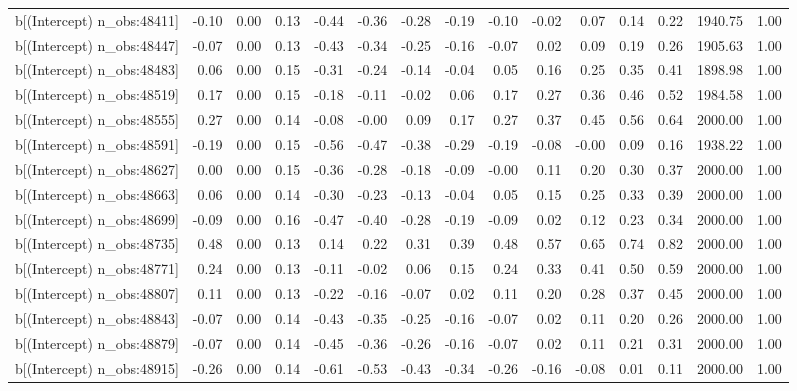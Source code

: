 \begin{table}[ht]
\begin{tabular}{rrrrrrrrrrrrrrr}
  b[(Intercept) n\_obs:48411] & -0.10 & 0.00 & 0.13 & -0.44 & -0.36 & -0.28 & -0.19 & -0.10 & -0.02 & 0.07 & 0.14 & 0.22 & 1940.75 & 1.00 \\ 
  b[(Intercept) n\_obs:48447] & -0.07 & 0.00 & 0.13 & -0.43 & -0.34 & -0.25 & -0.16 & -0.07 & 0.02 & 0.09 & 0.19 & 0.26 & 1905.63 & 1.00 \\ 
  b[(Intercept) n\_obs:48483] & 0.06 & 0.00 & 0.15 & -0.31 & -0.24 & -0.14 & -0.04 & 0.05 & 0.16 & 0.25 & 0.35 & 0.41 & 1898.98 & 1.00 \\ 
  b[(Intercept) n\_obs:48519] & 0.17 & 0.00 & 0.15 & -0.18 & -0.11 & -0.02 & 0.06 & 0.17 & 0.27 & 0.36 & 0.46 & 0.52 & 1984.58 & 1.00 \\ 
  b[(Intercept) n\_obs:48555] & 0.27 & 0.00 & 0.14 & -0.08 & -0.00 & 0.09 & 0.17 & 0.27 & 0.37 & 0.45 & 0.56 & 0.64 & 2000.00 & 1.00 \\ 
  b[(Intercept) n\_obs:48591] & -0.19 & 0.00 & 0.15 & -0.56 & -0.47 & -0.38 & -0.29 & -0.19 & -0.08 & -0.00 & 0.09 & 0.16 & 1938.22 & 1.00 \\ 
  b[(Intercept) n\_obs:48627] & 0.00 & 0.00 & 0.15 & -0.36 & -0.28 & -0.18 & -0.09 & -0.00 & 0.11 & 0.20 & 0.30 & 0.37 & 2000.00 & 1.00 \\ 
  b[(Intercept) n\_obs:48663] & 0.06 & 0.00 & 0.14 & -0.30 & -0.23 & -0.13 & -0.04 & 0.05 & 0.15 & 0.25 & 0.33 & 0.39 & 2000.00 & 1.00 \\ 
  b[(Intercept) n\_obs:48699] & -0.09 & 0.00 & 0.16 & -0.47 & -0.40 & -0.28 & -0.19 & -0.09 & 0.02 & 0.12 & 0.23 & 0.34 & 2000.00 & 1.00 \\ 
  b[(Intercept) n\_obs:48735] & 0.48 & 0.00 & 0.13 & 0.14 & 0.22 & 0.31 & 0.39 & 0.48 & 0.57 & 0.65 & 0.74 & 0.82 & 2000.00 & 1.00 \\ 
  b[(Intercept) n\_obs:48771] & 0.24 & 0.00 & 0.13 & -0.11 & -0.02 & 0.06 & 0.15 & 0.24 & 0.33 & 0.41 & 0.50 & 0.59 & 2000.00 & 1.00 \\ 
  b[(Intercept) n\_obs:48807] & 0.11 & 0.00 & 0.13 & -0.22 & -0.16 & -0.07 & 0.02 & 0.11 & 0.20 & 0.28 & 0.37 & 0.45 & 2000.00 & 1.00 \\ 
  b[(Intercept) n\_obs:48843] & -0.07 & 0.00 & 0.14 & -0.43 & -0.35 & -0.25 & -0.16 & -0.07 & 0.02 & 0.11 & 0.20 & 0.26 & 2000.00 & 1.00 \\ 
  b[(Intercept) n\_obs:48879] & -0.07 & 0.00 & 0.14 & -0.45 & -0.36 & -0.26 & -0.16 & -0.07 & 0.02 & 0.11 & 0.21 & 0.31 & 2000.00 & 1.00 \\ 
  b[(Intercept) n\_obs:48915] & -0.26 & 0.00 & 0.14 & -0.61 & -0.53 & -0.43 & -0.34 & -0.26 & -0.16 & -0.08 & 0.01 & 0.11 & 2000.00 & 1.00 \\ 

\end{tabular}
\end{table}
